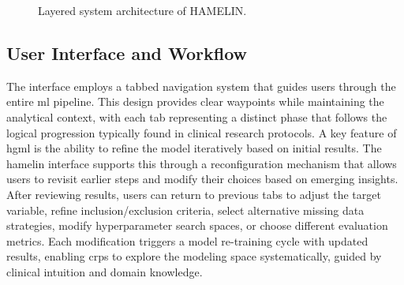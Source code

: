 \documentclass[conference,onecolumn]{IEEEtran}
\begin{document}
\begin{figure}[ht]
{
}
\caption{Layered system architecture of HAMELIN.}
\label{fig:system_architecture}
\end{figure}
  
\subsection{User Interface and Workflow}
  
The interface employs a tabbed navigation system that guides users through the entire \gls{ml} pipeline. This design provides clear waypoints while maintaining the analytical context, with each tab representing a distinct phase that follows the logical progression typically found in clinical research protocols. A key feature of \gls{hgml} is the ability to refine the model iteratively based on initial results. The \gls{hamelin} interface supports this through a reconfiguration mechanism that allows users to revisit earlier steps and modify their choices based on emerging insights. After reviewing results, users can return to previous tabs to adjust the target variable, refine inclusion/exclusion criteria, select alternative missing data strategies, modify hyperparameter search spaces, or choose different evaluation metrics. Each modification triggers a model re-training cycle with updated results, enabling \glspl{crp} to explore the modeling space systematically, guided by clinical intuition and domain knowledge.
\end{document}
